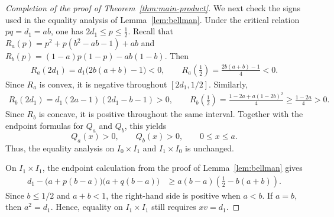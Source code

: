 \documentclass[11pt]{article}
\numberwithin{equation}{section}
\theoremstyle{definition}
\theoremstyle{remark}
\begin{document}
\begin{proof}[Completion of the proof of Theorem~\ref{thm:main-product}]
We next check the signs used in the equality analysis of
Lemma~\ref{lem:bellman}.  Under the critical relation
$pq=d_1=ab$, one has
$
 2d_1\leq p\leq\frac12.
$
Recall that
$
 R_a(p)
 =
 p^2+p(b^2-ab-1)+ab
$
and
$  
R_b(p)
 =
 (1-a)p(1-p)-ab(1-b).
$
Then
\begin{align*}
 R_a(2d_1)
 =
 d_1\bigl(2b(a+b)-1\bigr)<0,\qquad
 R_a\left(\frac12\right)=
 \frac{2b(a+b)-1}{4}<0.
\end{align*}
Since $R_a$ is convex, it is negative throughout
$[2d_1,1/2]$.  Similarly,
\begin{align*}
 R_b(2d_1)
 =
 d_1(2a-1)(2d_1-b-1)>0,\qquad
 R_b\left(\frac12\right)
 =
 \frac{1-2a+a(1-2b)^2}{4}
 \geq
 \frac{1-2a}{4}>0.
\end{align*}
Since $R_b$ is concave, it is positive throughout the same interval.
Together with the endpoint formulas for $Q_a$ and $Q_b$, this yields
\begin{equation*}
 Q_a(x)>0,
 \qquad
 Q_b(x)>0,
 \qquad 0\leq x\leq a.
\end{equation*}
Thus, the equality analysis on
$I_0\times I_1$ and $I_1\times I_0$ is unchanged.

On $I_1\times I_1$, the endpoint calculation from the proof of
Lemma~\ref{lem:bellman} gives
\begin{align*}
 d_1-
 \bigl(a+p(b-a)\bigr)
 \bigl(a+q(b-a)\bigr)
 &\geq
 a(b-a)\left(\frac12-b(a+b)\right).
\end{align*}
Since $b\leq1/2$ and $a+b<1$, the right-hand side is positive when
$a<b$.  If $a=b$, then $a^2=d_1$.  Hence, equality on
$I_1\times I_1$ still requires $xv=d_1$.


\end{proof}
\end{document}
